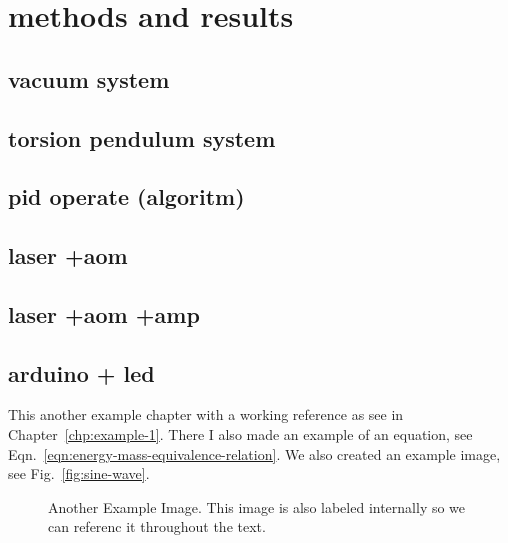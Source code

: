 \documentclass[\main/master.tex]{subfiles}
\begin{document}
\chapter{methods and results}\label{chp:example-2}
\section{vacuum system}
\section{torsion pendulum system}
\section{pid operate (algoritm)}
\section{laser +aom}
\section{laser +aom +amp}
\section{arduino + led}
\doublespacing
\hspace{5 mm} This another example chapter with a working reference as see in Chapter~\ref{chp:example-1}. There I also made an example of an equation, see Eqn.~\ref{eqn:energy-mass-equivalence-relation}. We also created an example image, see Fig.~\ref{fig:sine-wave}.
\begin{figure}[htbp]
	\centering
	\caption[Another Example Image]{Another Example Image. This image is also labeled internally so we can referenc it throughout the text.}
	\label{fig:cosine-wave}
\end{figure}
\end{document}
